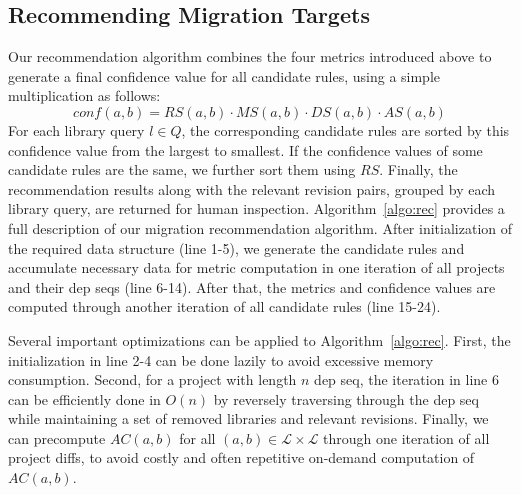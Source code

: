\documentclass[conference, 10pt]{IEEEtran}
\begin{document}
\subsection{Recommending Migration Targets}
\label{subsec:rec-targets}

Our recommendation algorithm combines the four metrics introduced above to generate a final confidence value for all candidate rules, using a simple multiplication as follows:
\begin{equation}
    conf(a, b) = RS(a,b) \cdot MS(a,b) \cdot DS(a,b) \cdot AS(a,b)
\label{eq:conf}
\end{equation}
For each library query $l\in Q$, the corresponding candidate rules are sorted by this confidence value from the largest to smallest.
If the confidence values of some candidate rules are the same, we further sort them using $RS$.
Finally, the recommendation results along with the relevant revision pairs, grouped by each library query, are returned for human inspection. 
Algorithm~\ref{algo:rec} provides a full description of our migration recommendation algorithm.
After initialization of the required data structure (line 1-5), we generate the candidate rules and accumulate necessary data for metric computation in one iteration of all projects and their dep seqs (line 6-14). 
After that, the metrics and confidence values are computed through another iteration of all candidate rules (line 15-24).

Several important optimizations can be applied to Algorithm~\ref{algo:rec}. 
First, the initialization in line 2-4 can be done lazily to avoid excessive memory consumption. 
Second, for a project with length $n$ dep seq, the iteration in line 6 can be efficiently done in $O(n)$ by reversely traversing through the dep seq while maintaining a set of removed libraries and relevant revisions. 
Finally, we can precompute $AC(a,b)$ for all $(a,b)\in \mathcal{L}\times \mathcal{L}$ through one iteration of all project diffs, to avoid costly and often repetitive on-demand computation of $AC(a,b)$.
\end{document}
